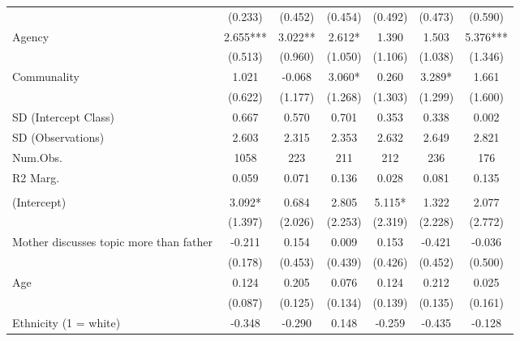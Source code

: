 \documentclass[
  letterpaper,
  DIV=11,
  numbers=noendperiod]{scrreprt}
\begin{document}
\begin{table}
\begin{tabular}[t]{lcccccc}
\hspace{1em} & (0.233) & (0.452) & (0.454) & (0.492) & (0.473) & (0.590)\\
\hspace{1em}Agency & 2.655*** & 3.022** & 2.612* & 1.390 & 1.503 & 5.376***\\
\hspace{1em} & (0.513) & (0.960) & (1.050) & (1.106) & (1.038) & (1.346)\\
\hspace{1em}Communality & 1.021 & -0.068 & 3.060* & 0.260 & 3.289* & 1.661\\
\hspace{1em} & (0.622) & (1.177) & (1.268) & (1.303) & (1.299) & (1.600)\\
\hspace{1em}SD (Intercept Class) & 0.667 & 0.570 & 0.701 & 0.353 & 0.338 & 0.002\\
\hspace{1em}SD (Observations) & 2.603 & 2.315 & 2.353 & 2.632 & 2.649 & 2.821\\
\hspace{1em}Num.Obs. & 1058 & 223 & 211 & 212 & 236 & 176\\
\hspace{1em}R2 Marg. & 0.059 & 0.071 & 0.136 & 0.028 & 0.081 & 0.135\\
\addlinespace[0.5em]
\multicolumn{7}{l}{\textit{Girls}}\\
\midrule \hspace{1em}(Intercept) & 3.092* & 0.684 & 2.805 & 5.115* & 1.322 & 2.077\\
\hspace{1em} & (1.397) & (2.026) & (2.253) & (2.319) & (2.228) & (2.772)\\
\hspace{1em}Mother discusses topic more than father & -0.211 & 0.154 & 0.009 & 0.153 & -0.421 & -0.036\\
\hspace{1em} & (0.178) & (0.453) & (0.439) & (0.426) & (0.452) & (0.500)\\
\hspace{1em}Age & 0.124 & 0.205 & 0.076 & 0.124 & 0.212 & 0.025\\
\hspace{1em} & (0.087) & (0.125) & (0.134) & (0.139) & (0.135) & (0.161)\\
\hspace{1em}Ethnicity (1 = white) & -0.348 & -0.290 & 0.148 & -0.259 & -0.435 & -0.128\\

\end{tabular}
\end{table}
\end{document}
